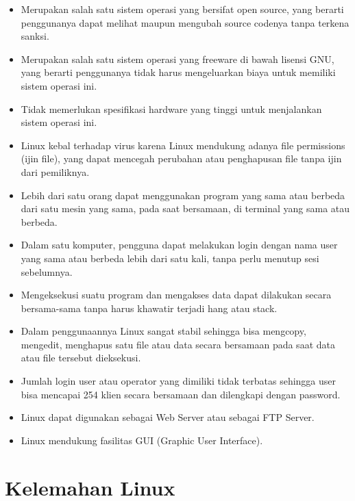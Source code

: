 \begin{itemize}

\item Merupakan salah satu sistem operasi yang bersifat open source, yang berarti penggunanya dapat melihat maupun mengubah source codenya tanpa terkena sanksi.

\item Merupakan salah satu sistem operasi yang freeware di bawah lisensi GNU, yang berarti penggunanya tidak harus mengeluarkan biaya untuk memiliki sistem operasi ini.

\item Tidak memerlukan spesifikasi hardware yang tinggi untuk menjalankan sistem operasi ini.

\item Linux kebal  terhadap virus karena Linux mendukung adanya file permissions (ijin file), yang dapat mencegah perubahan atau penghapusan file tanpa ijin dari pemiliknya.

\item Lebih dari satu orang dapat menggunakan program yang sama atau berbeda dari satu mesin yang sama, pada saat bersamaan, di terminal yang sama atau berbeda.

\item Dalam satu komputer, pengguna dapat melakukan login dengan nama user yang sama atau berbeda lebih dari satu kali, tanpa perlu menutup sesi sebelumnya.

\item Mengeksekusi suatu program dan mengakses data dapat dilakukan secara bersama-sama tanpa harus khawatir terjadi hang atau stack.

\item Dalam penggunaannya Linux sangat stabil sehingga bisa mengcopy, mengedit, menghapus satu file atau data secara bersamaan pada saat data atau file tersebut dieksekusi.

\item Jumlah login user atau operator yang dimiliki tidak terbatas sehingga user bisa mencapai 254 klien secara bersamaan dan dilengkapi dengan password.

\item Linux dapat digunakan sebagai Web Server atau sebagai FTP Server.

\item Linux mendukung fasilitas GUI (Graphic User Interface).

\end{itemize}

\section{Kelemahan Linux}


